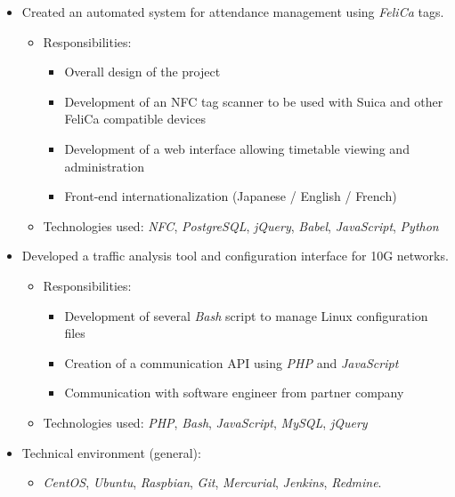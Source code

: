 \documentclass[11pt,a4paper,sans]{moderncv}
\newcommand{\techno}{\emph}
\newcommand{\lang}{\emph}
\begin{document}
{\begin{itemize}
\begin{itemize}
\begin{itemize}
            \end{itemize}
        \item Technologies used: \lang{C++}
    \end{itemize}
\item Created an automated system for attendance management using \techno{FeliCa} tags.
    \begin{itemize}%
        \item Responsibilities:
            \begin{itemize}%
                \item Overall design of the project
                \item Development of an NFC tag scanner to be used with Suica and other FeliCa compatible devices
                \item Development of a web interface allowing timetable viewing and administration
                \item Front-end internationalization (Japanese / English / French)
            \end{itemize}
        \item Technologies used: \techno{NFC}, \techno{PostgreSQL}, \techno{jQuery}, \techno{Babel}, \lang{JavaScript}, \lang{Python}
    \end{itemize}
\ifdefined\detailed%
\item Developed a traffic analysis tool and configuration interface for 10G networks.
    \begin{itemize}%
        \item Responsibilities:
            \begin{itemize}%
                \item Development of several \lang{Bash} script to manage Linux configuration files
                \item Creation of a communication API using \lang{PHP} and \lang{JavaScript}
                \item Communication with software engineer from partner company
            \end{itemize}
        \item Technologies used: \lang{PHP}, \lang{Bash}, \lang{JavaScript}, \techno{MySQL}, \techno{jQuery}
    \end{itemize}
\fi
\item Technical environment (general):
    \begin{itemize}%
        \item \techno{CentOS}, \techno{Ubuntu}, \techno{Raspbian}, \techno{Git}, \techno{Mercurial}, \techno{Jenkins}, \techno{Redmine}.
    \end{itemize}
\end{itemize}
}
\end{document}
